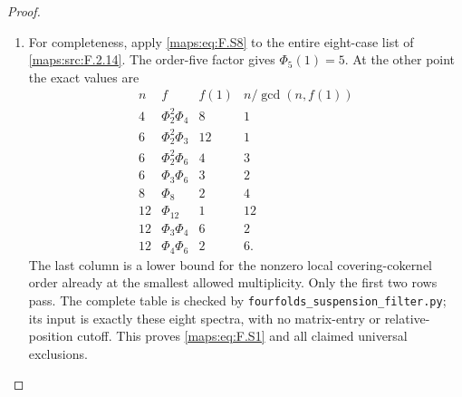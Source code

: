 \documentclass[11pt,a4paper]{article}
\theoremstyle{definition}
\begin{document}
\begin{proof}
\begin{enumerate}[label=\arabic*.]
\item For completeness, apply \eqref{maps:eq:F.S8} to the entire eight-case
list of \ref{maps:src:F.2.14}.  The order-five factor gives $\Phi_5(1)=5$.
At the other point the exact values are
\[
\begin{array}{c|c|r|r}
 n&f&f(1)&n/\gcd(n,f(1))\\\hline
 4&\Phi_2^2\Phi_4&8&1\\
 6&\Phi_2^2\Phi_3&12&1\\
 6&\Phi_2^2\Phi_6&4&3\\
 6&\Phi_3\Phi_6&3&2\\
 8&\Phi_8&2&4\\
 12&\Phi_{12}&1&12\\
 12&\Phi_3\Phi_4&6&2\\
 12&\Phi_4\Phi_6&2&6.
\end{array}
 \tag{F.S9}\label{maps:eq:F.S9}
\]
The last column is a lower bound for the nonzero local
covering-cokernel order already at the smallest allowed
multiplicity.  Only the first two rows pass.
The complete table is checked by
\texttt{fourfolds\_suspension\_filter.py}; its input is
exactly these eight spectra, with no matrix-entry or
relative-position cutoff.  This proves \eqref{maps:eq:F.S1} and all
claimed universal exclusions.

\end{enumerate}
\end{proof}
\end{document}
